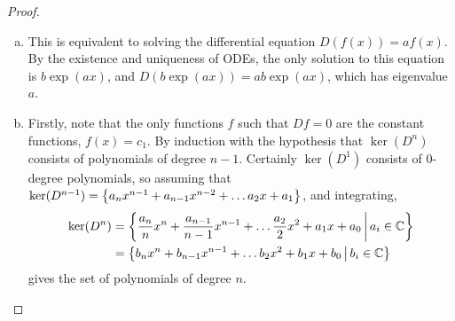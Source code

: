 \documentclass{article}
\begin{document}
\begin{proof} ~
  \begin{enumerate}[(a)]
    \item This is equivalent to solving the differential equation
    $D(f(x)) = af(x)$. By the existence and uniqueness of ODEs, the only
    solution to this equation is $b\exp(ax)$, and $D(b\exp(ax)) = ab\exp(ax)$,
    which has eigenvalue $a$.
    \item Firstly, note that the only functions $f$ such that $D f = 0$ are the
    constant functions, $f(x) = c_1$. By induction with the hypothesis that
    $\ker(D^n)$ consists of polynomials of degree $n-1$. Certainly $\ker(D^1)$
    consists of $0$-degree polynomials, so assuming that
    $\ker(D^{n-1}) = \left\{ a_{n}x^{n-1} + a_{n-1}x^{n-2} + \hdots a_{2}x + a_1 \right\}$,
    and integrating,
    \begin{align*}
      \ker(D^n) &= \left\{ \frac{a_{n}}{n}x^{n} + \frac{a_{n-1}}{n-1}x^{n-1} + \hdots \frac{a_{2}}{2}x^2 + a_1x + a_0 \,\middle|\, a_i \in \mathbb C \right\} \\
      &= \left\{ b_{n}x^{n} + b_{n-1}x^{n-1} + \hdots b_{2}x^2 + b_1x + b_0 \,\middle|\, b_i \in \mathbb C \right\}
    \end{align*} gives the set of polynomials of degree $n$.
  \end{enumerate}
\end{proof}
\begin{problem}{5} %

\end{problem}
\end{document}
